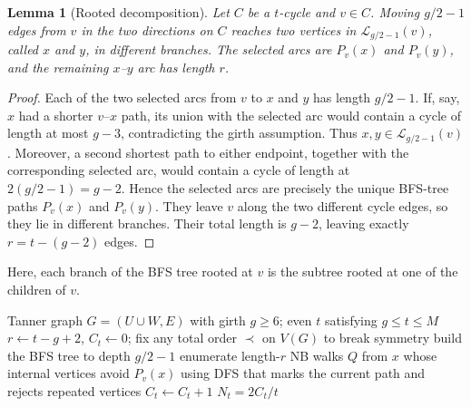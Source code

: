 \documentclass[conference]{IEEEtran}
\newtheorem{lemma}{Lemma}
\newcommand{\cL}{\mathcal{L}}
\begin{document}
\begin{lemma}[Rooted decomposition]\label{lem:decomp}
Let $C$ be a $t$-cycle and $v\in C$.  Moving $g/2-1$ edges from $v$ in the
two directions on $C$ reaches two vertices in $\cL_{g/2-1}(v)$, called $x$ and $y$, in different
branches.  The selected arcs are $P_v(x)$ and $P_v(y)$, and the remaining
$x$--$y$ arc has length $r$.
\end{lemma}
\begin{proof}
Each of the two selected arcs from $v$ to $x$ and $y$ has length $g/2-1$.
If, say, $x$ had a shorter $v$--$x$ path, its union with the selected arc
would contain a cycle of length at most $g-3$, contradicting the girth
assumption. Thus $x,y\in\cL_{g/2-1}(v)$. Moreover, a second shortest path
to either endpoint, together with the corresponding selected arc, would
contain a cycle of length at  $2\left(g/2-1\right)=g-2$.
Hence the selected arcs are precisely the unique BFS-tree paths
$P_v(x)$ and $P_v(y)$.
They leave $v$ along the two different cycle edges, so they lie in different branches.
Their total length is $g-2$, leaving exactly
$r=t-(g-2)$ edges.
\end{proof}

Here, each branch of the BFS tree rooted at $v$ is the subtree rooted at one
of the children of $v$.

\begin{algorithm}[t]
\caption{Exact counting of $t$-cycles}\label{alg:exact}
\footnotesize
\begin{algorithmic}[1]
\Require Tanner graph $G=(U\cup W,E)$ with girth $g\ge6$; even
$t$ satisfying $g\le t\le M$
\State $r\gets t-g+2$, $C_t\gets0$; fix any total order $\prec$ on $V(G)$ to break symmetry
  \State build the BFS tree to depth $g/2-1$
  \ForAll{$x\in\cL_{g/2-1}(v)$}
    \State enumerate length-$r$ NB walks $Q$ from $x$ whose internal vertices avoid $P_v(x)$
    \Statex \hspace{\algorithmicindent} using DFS that marks the current path and rejects repeated vertices
    \ForAll{such $Q$ ending at $y\in\cL_{g/2-1}(v)$}
        \State $C_t\gets C_t+1$
      \EndIf
    \EndFor
  \EndFor
\EndFor
\State \Return $N_t=2C_t/t$
\end{algorithmic}
\end{algorithm}
\end{document}
